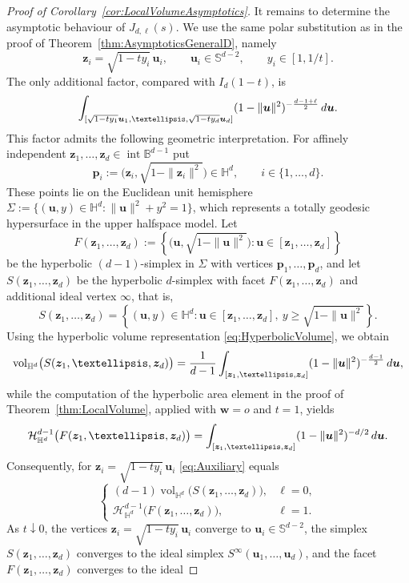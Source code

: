 \documentclass[10pt,a4paper]{amsart}
\def\BB{\mathbb{B}}
\def\HH{\mathbb{H}}
\def\SS{\mathbb{S}}
\def\bp{\mathbf{p}}
\newcommand{\bu}{\boldsymbol{u}}
\newcommand{\bw}{\boldsymbol{w}}
\newcommand{\bz}{\boldsymbol{z}}
\def\cH{\mathcal{H}}
\newcommand{\dint}{\textup{d}}
\newcommand{\inter}{\operatorname{int}}
\newcommand{\vol}{\mathop{\mathrm{vol}}\nolimits}
\begin{document}
\begin{proof}[Proof of Corollary~\ref{cor:LocalVolumeAsymptotics}]
	It remains to determine the asymptotic behaviour of
	$J_{d,\ell}(s)$. We use the same polar substitution as in the proof of
	Theorem~\ref{thm:AsymptoticsGeneralD}, namely
	\[
		\bz_i=\sqrt{1-t y_i}\,\bu_i,
		\qquad
		\bu_i\in\SS^{d-2},
		\qquad
		y_i\in[1,1/t].
	\]
	The only additional factor, compared with $I_d(1-t)$, is
	\begin{equation}\label{eq:Auxiliary}
		\int_{
			[\sqrt{1-t y_1}\bu_1,\ldots,
					\sqrt{1-t y_d}\bu_d]}
		(1-\|\bu\|^2)^{-\frac{d-1+\ell}{2}}
		\,\dint\bu.
	\end{equation}
	This factor admits the following geometric interpretation. For
	affinely independent $\bz_1,\ldots,\bz_d\in\inter\BB^{d-1}$ put
	\[
		\bp_i
		:=
		\bigl(\bz_i,\sqrt{1-\|\bz_i\|^2}\bigr)\in\HH^d,
		\qquad i\in\{1,\ldots,d\}.
	\]
	These points lie on the Euclidean unit hemisphere
	$\Sigma:=\{(\bu,y)\in\HH^d:\|\bu\|^2+y^2=1\}$, which represents a
	totally geodesic hypersurface in the upper halfspace model. Let
	\[
		F(\bz_1,\ldots,\bz_d)
		:=
		\left\{
		\bigl(\bu,\sqrt{1-\|\bu\|^2}\bigr):
		\bu\in[\bz_1,\ldots,\bz_d]
		\right\}
	\]
	be the hyperbolic $(d-1)$-simplex in $\Sigma$ with vertices
	$\bp_1,\ldots,\bp_d$, and let
	$S(\bz_1,\ldots,\bz_d)$ be the hyperbolic $d$-simplex with facet
	$F(\bz_1,\ldots,\bz_d)$ and additional ideal vertex $\infty$, that is,
	\[
		S(\bz_1,\ldots,\bz_d)
		=
		\left\{
		(\bu,y)\in\HH^d:
		\bu\in[\bz_1,\ldots,\bz_d],\
		y\ge\sqrt{1-\|\bu\|^2}
		\right\}.
	\]
	Using the hyperbolic volume representation
	\eqref{eq:HyperbolicVolume}, we obtain
	\[
		\vol_{\HH^d}\bigl(S(\bz_1,\ldots,\bz_d)\bigr)
		=
		\frac{1}{d-1}
		\int_{[\bz_1,\ldots,\bz_d]}
		(1-\|\bu\|^2)^{-\frac{d-1}{2}}\,\dint\bu,
	\]
	while the computation of the hyperbolic area element in the proof of
	Theorem~\ref{thm:LocalVolume}, applied with $\bw=o$ and $t=1$,
	yields
	\[
		\cH_{\HH^d}^{d-1}\bigl(F(\bz_1,\ldots,\bz_d)\bigr)
		=
		\int_{[\bz_1,\ldots,\bz_d]}
		(1-\|\bu\|^2)^{-d/2}\,\dint\bu.
	\]
	Consequently, for $\bz_i=\sqrt{1-ty_i}\,\bu_i$ \eqref{eq:Auxiliary}
	equals
	\[
		\begin{cases}
			(d-1)\vol_{\HH^d}\bigl(S(\bz_1,\ldots,\bz_d)\bigr),
			 & \ell=0, \\[1mm]
			\cH_{\HH^d}^{d-1}\bigl(F(\bz_1,\ldots,\bz_d)\bigr),
			 & \ell=1.
		\end{cases}
	\]
	As $t\downarrow0$, the vertices $\bz_i=\sqrt{1-ty_i}\,\bu_i$
	converge to $\bu_i\in\SS^{d-2}$, the simplex
	$S(\bz_1,\ldots,\bz_d)$ converges to the ideal simplex
	$S^\infty(\bu_1,\ldots,\bu_d)$, and the facet
	$F(\bz_1,\ldots,\bz_d)$ converges to the ideal

\end{proof}
\end{document}
